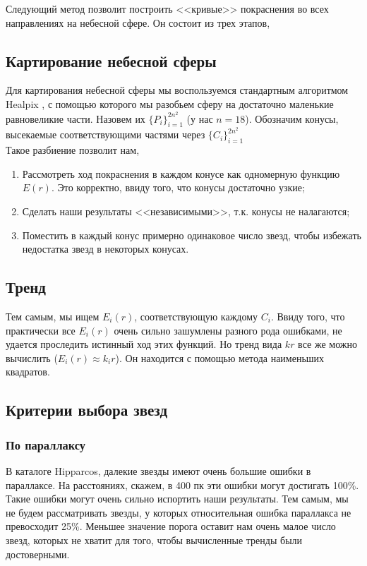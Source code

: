 \documentclass[14pt]{article}
\begin{document}
        Следующий метод позволит построить <<кривые>> покраснения во всех направлениях на небесной сфере. Он состоит из трех этапов,
        \subsection{Картирование небесной сферы}
            Для картирования небесной сферы мы воспользуемся стандартным алгоритмом Healpix \cite{healpix}, с помощью которого мы разобьем сферу на достаточно маленькие равновеликие части. Назовем их $\{P_i\}_{i = 1}^{2n^2}$ (у нас $n = 18$). Обозначим конусы, высекаемые соответствующими частями через $\{C_i\}_{i = 1}^{2n^2}$\\
            Такое разбиение позволит нам,
            \begin{enumerate}
                \item Рассмотреть ход покраснения в каждом конусе как одномерную функцию $E(r)$. Это корректно, ввиду того, что конусы достаточно узкие;
                \item Сделать наши результаты <<независимыми>>, т.к. конусы не налагаются;
                \item Поместить в каждый конус примерно одинаковое число звезд, чтобы избежать недостатка звезд в некоторых конусах.  
            \end{enumerate}  

        \subsection{Тренд}
            Тем самым, мы ищем $E_i(r)$, соответствующую каждому $C_i$. Ввиду того, что практически все $E_i(r)$ очень сильно зашумлены разного рода ошибками, не удается проследить истинный ход этих функций. Но тренд вида $k r$ все же можно вычислить ($E_i(r) \approx k_i r$). Он находится с помощью метода наименьших квадратов.  
            
        \subsection{Критерии выбора звезд}
            \subsubsection{По параллаксу}
                В каталоге Hipparcos, далекие звезды имеют очень большие ошибки в параллаксе. На расстояниях, скажем, в 400 пк эти ошибки могут достигать 100\%. Такие ошибки могут очень сильно испортить наши результаты. Тем самым, мы не будем рассматривать звезды, у которых относительная ошибка параллакса не превосходит 25\%. Меньшее значение порога оставит нам очень малое число звезд, которых не хватит для того, чтобы вычисленные тренды были достоверными.
\end{document}
